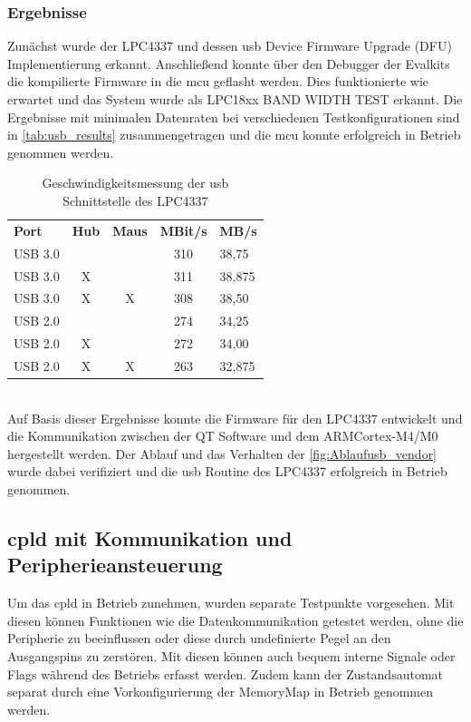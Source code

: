\subsubsection*{Ergebnisse}
Zunächst wurde der LPC4337 und dessen \ac{usb} Device Firmware Upgrade (DFU) Implementierung erkannt. Anschließend konnte über den Debugger der  Evalkits die kompilierte Firmware in die \ac{mcu} geflasht werden. Dies funktionierte wie erwartet und das System wurde als \glqq LPC18xx BAND WIDTH TEST\grqq{} erkannt. Die Ergebnisse mit minimalen Datenraten bei verschiedenen Testkonfigurationen sind in \autoref{tab:usb_results} zusammengetragen und die \ac{mcu} konnte erfolgreich in Betrieb genommen werden.
\begin{table}[h!]
\centering
\caption{Geschwindigkeitsmessung der \acs{usb} Schnittstelle des LPC4337}
\label{tab:usb_results}
\begin{tabular}{l|c|c|c|l}
\textbf{Port} & \textbf{Hub} & \textbf{Maus} & \textbf{MBit/s} & \textbf{MB/s} \\
\cline{1-5}
USB 3.0 &  	&  	& 310 &	38,75	\\ 
USB 3.0 & X	&  	& 311 & 38,875	\\
USB 3.0 & X & X & 308 & 38,50	\\
\cline{1-5}
USB 2.0 &  	&  	& 274 & 34,25	\\
USB 2.0 & X &  	& 272 & 34,00	\\
USB 2.0 & X & X	& 263 & 32,875
\end{tabular}
\end{table}\\
Auf Basis dieser Ergebnisse konnte die Firmware für den LPC4337 entwickelt und die Kommunikation zwischen der QT Software und dem ARM\SymbReg Cortex\SymbReg-M4/M0 hergestellt werden. Der Ablauf und das Verhalten der \autoref{fig:Ablaufusb_vendor} wurde dabei verifiziert und die \ac{usb} Routine des LPC4337 erfolgreich in Betrieb genommen.
\subsection{\ac{cpld} mit Kommunikation und Peripherieansteuerung}
Um das \ac{cpld} in Betrieb zunehmen, wurden separate Testpunkte vorgesehen. Mit diesen können Funktionen wie die Datenkommunikation getestet werden, ohne die Peripherie zu beeinflussen oder diese durch undefinierte Pegel an den Ausgangspins zu zerstören. Mit diesen können auch bequem interne Signale oder Flags während des Betriebs erfasst werden. Zudem kann der Zustandsautomat separat durch eine Vorkonfigurierung der MemoryMap in Betrieb genommen werden.
